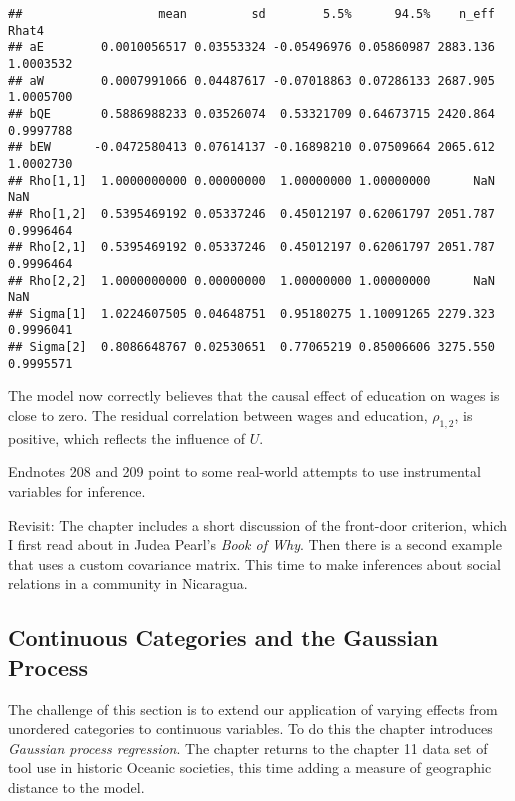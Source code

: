 \documentclass[
]{book}
\begin{document}
\begin{verbatim}
##                   mean         sd        5.5%      94.5%    n_eff     Rhat4
## aE        0.0010056517 0.03553324 -0.05496976 0.05860987 2883.136 1.0003532
## aW        0.0007991066 0.04487617 -0.07018863 0.07286133 2687.905 1.0005700
## bQE       0.5886988233 0.03526074  0.53321709 0.64673715 2420.864 0.9997788
## bEW      -0.0472580413 0.07614137 -0.16898210 0.07509664 2065.612 1.0002730
## Rho[1,1]  1.0000000000 0.00000000  1.00000000 1.00000000      NaN       NaN
## Rho[1,2]  0.5395469192 0.05337246  0.45012197 0.62061797 2051.787 0.9996464
## Rho[2,1]  0.5395469192 0.05337246  0.45012197 0.62061797 2051.787 0.9996464
## Rho[2,2]  1.0000000000 0.00000000  1.00000000 1.00000000      NaN       NaN
## Sigma[1]  1.0224607505 0.04648751  0.95180275 1.10091265 2279.323 0.9996041
## Sigma[2]  0.8086648767 0.02530651  0.77065219 0.85006606 3275.550 0.9995571
\end{verbatim}

The model now correctly believes that the causal effect of education on wages is close to zero. The residual correlation between wages and education, \(\rho_{1,2}\), is positive, which reflects the influence of \(U\).

Endnotes 208 and 209 point to some real-world attempts to use instrumental variables for inference.

Revisit: The chapter includes a short discussion of the front-door criterion, which I first read about in Judea Pearl's \emph{Book of Why}. Then there is a second example that uses a custom covariance matrix. This time to make inferences about social relations in a community in Nicaragua.

\hypertarget{continuous-categories-and-the-gaussian-process}{%
\subsection*{Continuous Categories and the Gaussian Process}\label{continuous-categories-and-the-gaussian-process}}

The challenge of this section is to extend our application of varying effects from unordered categories to continuous variables. To do this the chapter introduces \emph{Gaussian process regression}. The chapter returns to the chapter 11 data set of tool use in historic Oceanic societies, this time adding a measure of geographic distance to the model.
\end{document}
